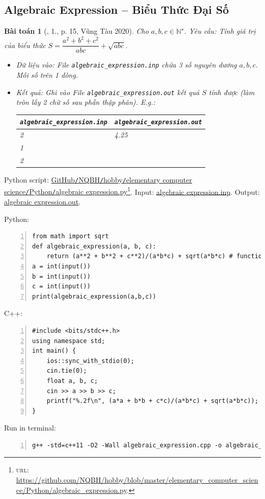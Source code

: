 \documentclass{article}
\newtheorem{baitoan}{Bài toán}
\begin{document}

\subsection{Algebraic Expression -- Biểu Thức Đại Số}

\begin{baitoan}[\cite{VietSTEM2021}, 1., p. 15, Vũng Tàu 2020]
	Cho $a,b,c\in\mathbb{N}^\star$. {\sf Yêu cầu:} Tính giá trị của biểu thức $S = \dfrac{a^2 + b^2 + c^2}{abc} + \sqrt{abc}$.
	\begin{itemize}
		\item {\sf Dữ liệu vào:} File \verb|algebraic_expression.inp| chứa 3 số nguyên dương $a,b,c$. Mỗi số trên 1 dòng.
		\item {\sf Kết quả:} Ghi vào File \verb|algebraic_expression.out| kết quả $S$ tính được (làm tròn lấy 2 chữ số sau phần thập phân). E.g.:
		\begin{table}[H]
			\centering
			\begin{tabular}{|l|l|}
				\hline
				\verb|algebraic_expression.inp| & \verb|algebraic_expression.out| \\
				\hline
				2 & 4.25 \\
				1 &  \\
				2 &  \\
				\hline
			\end{tabular}
		\end{table}
	\end{itemize}
\end{baitoan}
Python script: \href{https://github.com/NQBH/hobby/blob/master/elementary_computer_science/Python/algebraic_expression.py}{GitHub\texttt{/}NQBH\texttt{/}hobby\texttt{/}elementary computer science\texttt{/}Python\texttt{/}algebraic expression.py}\footnote{\textsc{url}: \url{https://github.com/NQBH/hobby/blob/master/elementary_computer_science/Python/algebraic_expression.py}.}. Input: \href{https://github.com/NQBH/hobby/blob/master/elementary_computer_science/Python/algebraic_expression.inp}{algebraic expression.inp}. Output: \href{https://github.com/NQBH/hobby/blob/master/elementary_computer_science/Python/algebraic_expression.out}{algebraic expression.out}.

Python:
\begin{Verbatim}[numbers=left,xleftmargin=5mm]
from math import sqrt
def algebraic_expression(a, b, c):
    return (a**2 + b**2 + c**2)/(a*b*c) + sqrt(a*b*c) # function f(a,b,c) can be modified
a = int(input())
b = int(input())
c = int(input())
print(algebraic_expression(a,b,c))
\end{Verbatim}
C++:
\begin{Verbatim}[numbers=left,xleftmargin=5mm]
#include <bits/stdc++.h>
using namespace std;
int main() {
    ios::sync_with_stdio(0);
    cin.tie(0);
    float a, b, c;
    cin >> a >> b >> c;
    printf("%.2f\n", (a*a + b*b + c*c)/(a*b*c) + sqrt(a*b*c));
}
\end{Verbatim}
Run in terminal:
\begin{Verbatim}[numbers=left,xleftmargin=5mm]
g++ -std=c++11 -O2 -Wall algebraic_expression.cpp -o algebraic_expression
\end{Verbatim}
\end{document}
